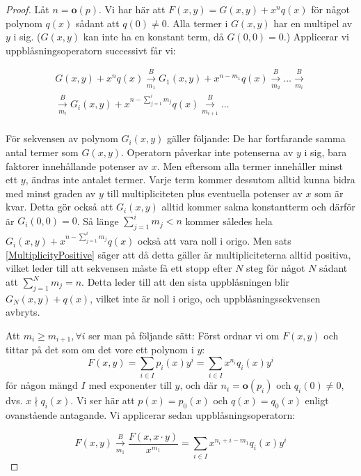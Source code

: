\begin{proof}
Låt $n=\mathbf{o}(p)$. Vi har här att $F(x,y)=G(x,y)+x^nq(x)$ för något polynom $q(x)$ sådant att $q(0)\neq 0$. Alla termer i $G(x,y)$ har en multipel av $y$ i sig. ($G(x,y)$ kan inte ha en konstant term, då $G(0,0)=0$.) Applicerar vi uppblåsningsoperatorn successivt får vi:

\[
\begin{array}{c}
G(x,y)+x^nq(x) \overset{B}{\underset{m_1}{\longrightarrow}} G_1(x,y)+x^{n-m_1}q(x) \overset{B}{\underset{m_2}{\longrightarrow}} \ldots \overset{B}{\underset{m_i}{\longrightarrow}} \\[15pt]
\overset{B}{\underset{m_i}{\longrightarrow}} G_i(x,y)+x^{n-\sum_{j=1}^{i}m_j}q(x) \overset{B}{\underset{m_{i+1}}{\longrightarrow}} \ldots \\
\end{array}
\]

För sekvensen av polynom $G_i(x,y)$ gäller följande: De har fortfarande samma antal termer som $G(x,y)$. Operatorn påverkar inte potenserna av $y$ i sig, bara faktorer innehållande potenser av $x$. Men eftersom alla termer innehåller minst ett $y$, ändras inte antalet termer. Varje term kommer dessutom alltid kunna bidra med minst graden av $y$ till multipliciteten plus eventuella potenser av $x$ som är kvar. Detta gör också att $G_i(x,y)$ alltid kommer sakna konstantterm och därför är $G_i(0,0)=0$. Så länge $\sum_{j=1}^{i}m_j<n$ kommer således hela $G_i(x,y)+x^{n-\sum_{j=1}^{i}m_j}q(x)$ också att vara noll i origo. Men sats \ref{MultiplicityPositive} säger att då detta gäller är multipliciteterna alltid positiva, vilket leder till att sekvensen måste få ett stopp efter $N$ steg för något $N$ sådant att $\sum_{j=1}^{N}m_j=n$. Detta leder till att den sista uppblåsningen blir $G_N(x,y)+q(x)$, vilket inte är noll i origo, och uppblåsningssekvensen avbryts.

Att $m_i \geq m_{i+1}, \forall i$ ser man på följande sätt: Först ordnar vi om $F(x,y)$ och tittar på det som om det vore ett polynom i $y$:
\[F(x,y) = \sum_{i\in I} p_i(x)y^i = \sum_{i\in I} x^{n_i}q_i(x)y^i\]
för någon mängd $I$ med exponenter till $y$, och där $n_i=\mathbf{o}(p_i)$ och $q_i(0)\neq 0$, dvs. $x \nmid q_i(x)$. Vi ser här att $p(x)=p_0(x)$ och $q(x)=q_0(x)$ enligt ovanstående antagande. Vi applicerar sedan uppblåsnings\-operatorn:

\[F(x,y) \overset{B}{\underset{m_1}{\longrightarrow}} \frac{F(x,x\cdot y)}{x^{m_1}}=\sum_{i\in I} x^{n_i+i-m_1}q_i(x)y^i\]


\end{proof}
